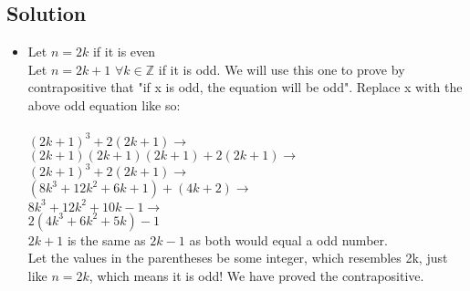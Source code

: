 \documentclass[11pt]{article}
\begin{document}
    \subsection*{Solution}
    \begin{itemize}
        \item[] Let \(n = 2k\) if it is even \\
        Let \(n= 2k+1\) \(\forall k \in \mathbb{Z}\) if it is odd. We will use this one to prove by contrapositive that "if x is odd, the equation will be odd". 
        Replace x with the above odd equation like so: \\ \\\((2k+1)^3+2(2k+1) \rightarrow \) \\
        \((2k+1)(2k+1)(2k+1)+2(2k+1) \rightarrow \) \\
        \((2k+1)^3+2(2k+1) \rightarrow \) \\
        \((8k^3+12k^2+6k+1) + (4k+2) \rightarrow\) \\
        \(8k^3+12k^2+10k-1 \rightarrow\) \\
        \(2(4k^3+6k^2+5k) - 1 \) \\

        \(2k+1\) is the same as \(2k-1\) as both would equal a odd number. \\
        
        Let the values in the parentheses be some integer, which resembles 2k, just like \(n=2k\), which means it is odd! We have proved the contrapositive.
    \end{itemize}
\end{document}
